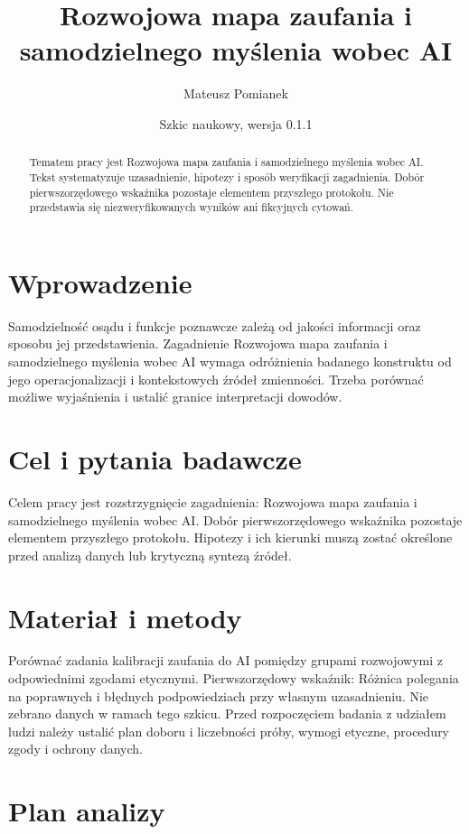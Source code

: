 \documentclass[11pt,a4paper]{article}
\title{Rozwojowa mapa zaufania i samodzielnego myślenia wobec AI}
\author{Mateusz Pomianek}
\date{Szkic naukowy, wersja 0.1.1}
\begin{document}
\maketitle

\begin{abstract}

Tematem pracy jest Rozwojowa mapa zaufania i samodzielnego myślenia wobec AI. Tekst systematyzuje uzasadnienie, hipotezy i sposób weryfikacji zagadnienia. Dobór pierwszorzędowego wskaźnika pozostaje elementem przyszłego protokołu. Nie przedstawia się niezweryfikowanych wyników ani fikcyjnych cytowań.

\end{abstract}

\section{Wprowadzenie}

Samodzielność osądu i funkcje poznawcze zależą od jakości informacji oraz sposobu jej przedstawienia. Zagadnienie Rozwojowa mapa zaufania i samodzielnego myślenia wobec AI wymaga odróżnienia badanego konstruktu od jego operacjonalizacji i kontekstowych źródeł zmienności. Trzeba porównać możliwe wyjaśnienia i ustalić granice interpretacji dowodów.

\section{Cel i pytania badawcze}

Celem pracy jest rozstrzygnięcie zagadnienia: Rozwojowa mapa zaufania i samodzielnego myślenia wobec AI. Dobór pierwszorzędowego wskaźnika pozostaje elementem przyszłego protokołu. Hipotezy i ich kierunki muszą zostać określone przed analizą danych lub krytyczną syntezą źródeł.

\section{Materiał i metody}

Porównać zadania kalibracji zaufania do AI pomiędzy grupami rozwojowymi z odpowiednimi zgodami etycznymi. Pierwszorzędowy wskaźnik: Różnica polegania na poprawnych i błędnych podpowiedziach przy własnym uzasadnieniu. Nie zebrano danych w ramach tego szkicu. Przed rozpoczęciem badania z udziałem ludzi należy ustalić plan doboru i liczebności próby, wymogi etyczne, procedury zgody i ochrony danych.

\section{Plan analizy}
\end{document}
